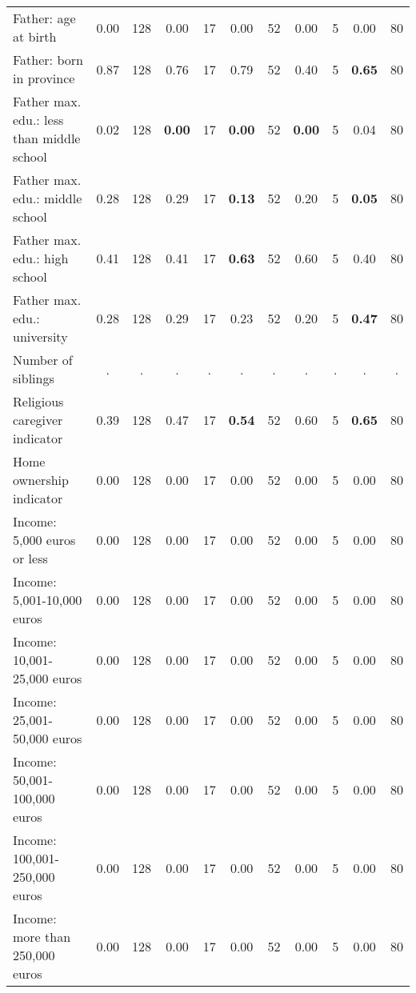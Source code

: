 \begin{tabular}{l c c c c c c c c c c}
Father: age at birth &      0.00 &       128 &      0.00 &        17 &      0.00 &        52 &      0.00 &         5 &      0.00 &        80 \\
Father: born in province &      0.87 &       128 &      0.76 &        17 &      0.79 &        52 &      0.40 &         5 & \textbf{     0.65} &        80 \\
Father max. edu.: less than middle school &      0.02 &       128 & \textbf{     0.00} &        17 & \textbf{     0.00} &        52 & \textbf{     0.00} &         5 &      0.04 &        80 \\
Father max. edu.: middle school &      0.28 &       128 &      0.29 &        17 & \textbf{     0.13} &        52 &      0.20 &         5 & \textbf{     0.05} &        80 \\
Father max. edu.: high school &      0.41 &       128 &      0.41 &        17 & \textbf{     0.63} &        52 &      0.60 &         5 &      0.40 &        80 \\
Father max. edu.: university &      0.28 &       128 &      0.29 &        17 &      0.23 &        52 &      0.20 &         5 & \textbf{     0.47} &        80 \\
Number of siblings &         . & . &         . & . &         . & . &         . & . &         . & . \\
Religious caregiver indicator &      0.39 &       128 &      0.47 &        17 & \textbf{     0.54} &        52 &      0.60 &         5 & \textbf{     0.65} &        80 \\
Home ownership indicator &      0.00 &       128 &      0.00 &        17 &      0.00 &        52 &      0.00 &         5 &      0.00 &        80 \\
Income: 5,000 euros or less &      0.00 &       128 &      0.00 &        17 &      0.00 &        52 &      0.00 &         5 &      0.00 &        80 \\
Income: 5,001-10,000 euros &      0.00 &       128 &      0.00 &        17 &      0.00 &        52 &      0.00 &         5 &      0.00 &        80 \\
Income: 10,001-25,000 euros &      0.00 &       128 &      0.00 &        17 &      0.00 &        52 &      0.00 &         5 &      0.00 &        80 \\
Income: 25,001-50,000 euros &      0.00 &       128 &      0.00 &        17 &      0.00 &        52 &      0.00 &         5 &      0.00 &        80 \\
Income: 50,001-100,000 euros &      0.00 &       128 &      0.00 &        17 &      0.00 &        52 &      0.00 &         5 &      0.00 &        80 \\
Income: 100,001-250,000 euros &      0.00 &       128 &      0.00 &        17 &      0.00 &        52 &      0.00 &         5 &      0.00 &        80 \\
Income: more than 250,000 euros &      0.00 &       128 &      0.00 &        17 &      0.00 &        52 &      0.00 &         5 &      0.00 &        80 \\
\bottomrule
\end{tabular}
